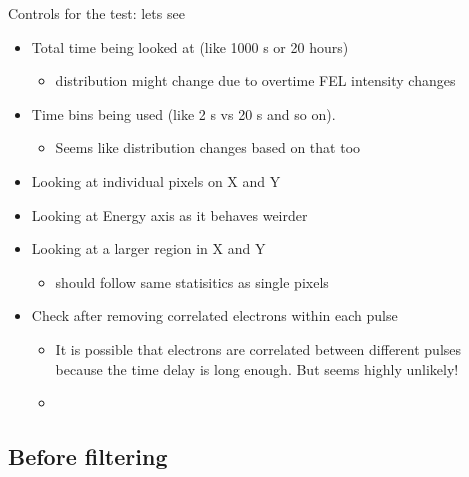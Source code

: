 Controls for the test:
lets see
\begin{itemize}
    \item Total time being looked at (like 1000 s or 20 hours)
    \begin{itemize}
        \item distribution might change due to overtime FEL intensity changes
    \end{itemize}
    \item Time bins being used (like 2 s vs 20 s and so on).
    \begin{itemize}
        \item Seems like distribution changes based on that too
    \end{itemize}
    \item Looking at individual pixels on X and Y
    \item Looking at Energy axis as it behaves weirder
    \item Looking at a larger region in X and Y 
    \begin{itemize}
        \item should follow same statisitics as single pixels
    \end{itemize}
    \item Check after removing correlated electrons within each pulse
    \begin{itemize}
        \item It is possible that electrons are correlated between different pulses because the time delay is long enough. But seems highly unlikely!
    \end{itemize}
    \begin{itemize}
        \item 
    \end{itemize}
\end{itemize}


\subsection{Before filtering}

